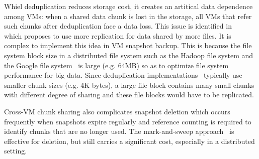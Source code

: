 Whiel deduplication reduces storage cost, it creates an artitical data dependence among VMs: when a shared data chunk
is lost in the storage, all VMs that refer such chunks after deduplication face a data loss.
This issue is identified in ~\cite{Baghat2006} which proposes to use more replication for data shared by more files.
It is complex to implement this idea in VM snapshot backup. 
This is because the file system block  size in a distributed file system such as  
the Hadoop file system and the Google file system~\cite{googlefs03}
is large (e.g.  64MB) so as to optimize file system performance
for big data. Since  deduplication implementations~\cite{Guo2011,extreme_binning09,bottleneck08,Jin2009,Dong2011}
 typically use smaller chunk sizes (e.g. 4K bytes),  a large file block contains many small chunks with different 
degree of sharing and  these file blocks would have to be replicated.
 
Cross-VM chunk sharing also complicates snapshot deletion which occurs frequently when snapshots expire regularly
and reference counting is required to identify chunks that are no longer used. 
The mark-and-sweep approach~\cite{Guo2011,Fabiano2013}  is effective for
deletion, but still carries a significant cost, especially in a distributed 
setting.  




